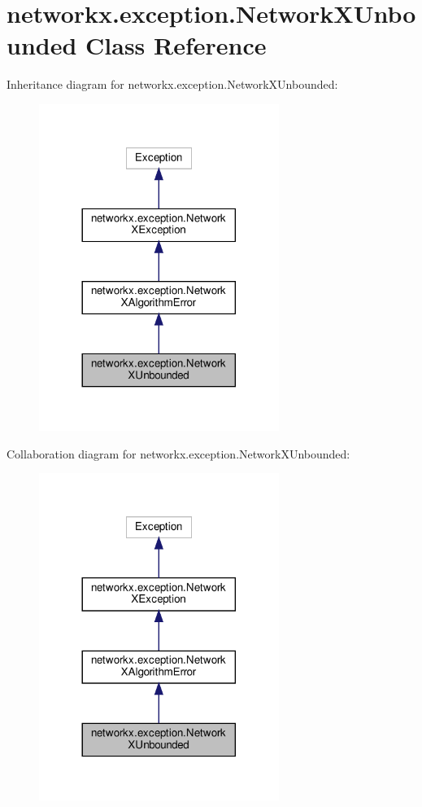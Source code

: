 \hypertarget{classnetworkx_1_1exception_1_1NetworkXUnbounded}{}\section{networkx.\+exception.\+Network\+X\+Unbounded Class Reference}
\label{classnetworkx_1_1exception_1_1NetworkXUnbounded}


Inheritance diagram for networkx.\+exception.\+Network\+X\+Unbounded\+:
\nopagebreak
\begin{figure}[H]
\begin{center}
\leavevmode
\includegraphics[width=221pt]{classnetworkx_1_1exception_1_1NetworkXUnbounded__inherit__graph}
\end{center}
\end{figure}


Collaboration diagram for networkx.\+exception.\+Network\+X\+Unbounded\+:
\nopagebreak
\begin{figure}[H]
\begin{center}
\leavevmode
\includegraphics[width=221pt]{classnetworkx_1_1exception_1_1NetworkXUnbounded__coll__graph}
\end{center}
\end{figure}


